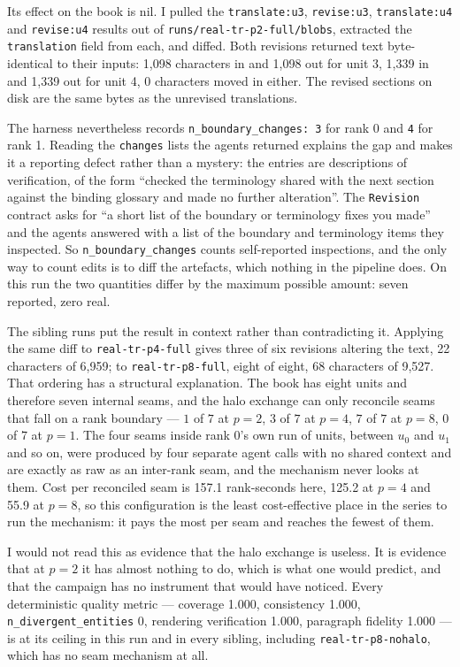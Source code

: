 \documentclass[11pt]{article}
\begin{document}
Its effect on the book is nil. I pulled the \texttt{translate:u3}, \texttt{revise:u3},
\texttt{translate:u4} and \texttt{revise:u4} results out of \texttt{runs/real-tr-p2-full/blobs},
extracted the \texttt{translation} field from each, and diffed. Both revisions returned text
byte-identical to their inputs: 1{,}098 characters in and 1{,}098 out for unit 3, 1{,}339 in and
1{,}339 out for unit 4, 0 characters moved in either. The revised sections on disk are the same
bytes as the unrevised translations.

The harness nevertheless records \texttt{n\_boundary\_changes: 3} for rank 0 and \texttt{4} for
rank 1. Reading the \texttt{changes} lists the agents returned explains the gap and makes it a
reporting defect rather than a mystery: the entries are descriptions of verification, of the form
``checked the terminology shared with the next section against the binding glossary and made no
further alteration''. The \texttt{Revision} contract asks for ``a short list of the boundary or
terminology fixes you made'' and the agents answered with a list of the boundary and terminology
items they inspected. So \texttt{n\_boundary\_changes} counts self-reported inspections, and the
only way to count edits is to diff the artefacts, which nothing in the pipeline does. On this run
the two quantities differ by the maximum possible amount: seven reported, zero real.

The sibling runs put the result in context rather than contradicting it. Applying the same diff to
\texttt{real-tr-p4-full} gives three of six revisions altering the text, 22 characters of 6{,}959;
to \texttt{real-tr-p8-full}, eight of eight, 68 characters of 9{,}527. That ordering has a
structural explanation. The book has eight units and therefore seven internal seams, and the halo
exchange can only reconcile seams that fall on a rank boundary --- $1$ of $7$ at $p=2$, $3$ of $7$
at $p=4$, $7$ of $7$ at $p=8$, $0$ of $7$ at $p=1$. The four seams inside rank 0's own run of
units, between $u_0$ and $u_1$ and so on, were produced by four separate agent calls with no
shared context and are exactly as raw as an inter-rank seam, and the mechanism never looks at
them. Cost per reconciled seam is 157.1 rank-seconds here, 125.2 at $p=4$ and 55.9 at $p=8$, so
this configuration is the least cost-effective place in the series to run the mechanism: it pays
the most per seam and reaches the fewest of them.

I would not read this as evidence that the halo exchange is useless. It is evidence that at
$p=2$ it has almost nothing to do, which is what one would predict, and that the campaign has no
instrument that would have noticed. Every deterministic quality metric --- coverage 1.000,
consistency 1.000, \texttt{n\_divergent\_entities} 0, rendering verification 1.000, paragraph
fidelity 1.000 --- is at its ceiling in this run and in every sibling, including
\texttt{real-tr-p8-nohalo}, which has no seam mechanism at all.
\end{document}
